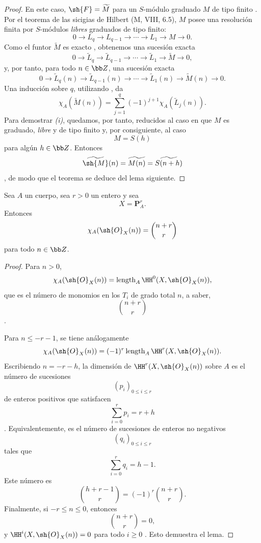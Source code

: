 \documentclass[oneside]{amsart}
\renewcommand{\leq}{\leqslant}
\renewcommand{\geq}{\geqslant}
\newcommand{\oldpage}[2][]{{\marginnote{\normalfont\textbf{#1}~|~#2}}\ignorespaces}
\let\EGAOriginalLabel\label
\renewcommand{\label}[1]{\phantomsection\EGAOriginalLabel{#1}}
\begin{document}
\begin{proof}
En este caso, $\sh{F}=\widetilde{M}$ para un $S$-módulo graduado $M$ de tipo finito .
Por el teorema de las sicigias de Hilbert (M, VIII, 6.5), $M$ posee una resolución finita por $S$-módulos \emph{libres} graduados de tipo finito:
\[
  0\longrightarrow L_q
  \longrightarrow L_{q-1}
  \longrightarrow\cdots
  \longrightarrow L_1
  \longrightarrow M
  \longrightarrow0.
\]
Como el funtor $\widetilde{M}$ es exacto , obtenemos una sucesión exacta
\[
  0\longrightarrow\widetilde{L}_q
  \longrightarrow\widetilde{L}_{q-1}
  \longrightarrow\cdots
  \longrightarrow\widetilde{L}_1
  \longrightarrow\widetilde{M}
  \longrightarrow0,
\]
y, por tanto, para todo $n\in\bb Z$, una sucesión exacta
\[
  0\longrightarrow\widetilde{L}_q(n)
  \longrightarrow\widetilde{L}_{q-1}(n)
  \longrightarrow\cdots
  \longrightarrow\widetilde{L}_1(n)
  \longrightarrow\widetilde{M}(n)
  \longrightarrow0.
\]
Una inducción sobre $q$, utilizando , da
\[
  \chi_A(\widetilde{M}(n))
  =
  \sum_{j=1}^{q}
  (-1)^{j+1}\chi_A(\widetilde{L}_j(n)).
\]
Para demostrar \emph{(i)}, quedamos, por tanto, reducidos al caso en que $M$ es graduado, \emph{libre} y de tipo finito y, por consiguiente, al caso
\[
  M=S(h)
\]
para algún $h\in\bb Z$.
Entonces
\[
  \widetilde{\sh{M}}(n)
  =
  \widetilde{M(n)}
  =
  \widetilde{S(n+h)}
\]
, de modo que el teorema se deduce del lema siguiente.
\end{proof}

\oldpage[III]{111}
\begin{lemma}[2.5.3.1]
\label{III.2.5.3.1}
Sea $A$ un cuerpo, sea $r>0$ un entero y sea
\[
  X=\mathbf{P}_A^r.
\]
Entonces
\[
  \chi_A(\sh{O}_X(n))
  =
  \binom{n+r}{r}
\]
para todo $n\in\bb Z$.
\end{lemma}

\begin{proof}
Para $n>0$,
\[
  \chi_A(\sh{O}_X(n))
  =
  \operatorname{length}_A\HH^0(X,\sh{O}_X(n)),
\]
que es el número de monomios en los $T_i$ de grado total $n$, a saber,
\[
  \binom{n+r}{r}
\]
.

Para $n\leq-r-1$, se tiene análogamente
\[
  \chi_A(\sh{O}_X(n))
  =
  (-1)^r\operatorname{length}_A\HH^r(X,\sh{O}_X(n)).
\]
Escribiendo $n=-r-h$, la dimensión de $\HH^r(X,\sh{O}_X(n))$ sobre $A$ es el número de sucesiones
\[
  (p_i)_{0\leq i\leq r}
\]
de enteros positivos que satisfacen
\[
  \sum_{i=0}^{r}p_i=r+h
\]
.
Equivalentemente, es el número de sucesiones de enteros no negativos
\[
  (q_i)_{0\leq i\leq r}
\]
tales que
\[
  \sum_{i=0}^{r}q_i=h-1.
\]
Este número es
\[
  \binom{h+r-1}{r}
  =
  (-1)^r\binom{n+r}{r}.
\]
Finalmente, si $-r\leq n\leq0$, entonces
\[
  \binom{n+r}{r}=0,
\]
y $\HH^i(X,\sh{O}_X(n))=0$ para todo $i\geq0$ .
Esto demuestra el lema.
\end{proof}
\end{document}

